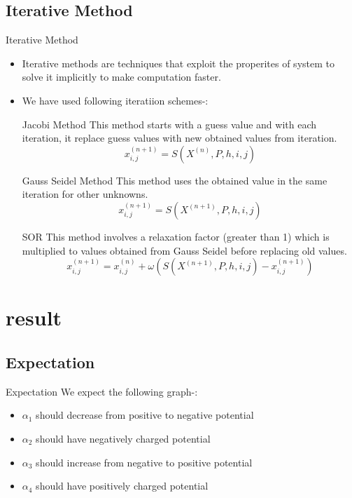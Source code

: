 \documentclass[8pt]{beamer}
\begin{document}
		\subsection{Iterative Method }
		\begin{frame}{Iterative Method}
			\begin{itemize}
				\item Iterative methods are techniques that exploit the properites of system to solve it implicitly to make computation faster.
				\item We have used following iteratiion schemes-:\\
			
					 \begin{block}{Jacobi Method}
						This method starts with a guess value and with each iteration, it replace guess values with new obtained values from iteration.$$ x^{(n+1)}_{i,j} = S(X^{(n)},P,h,i,j) $$
						\end{block}
					 \begin{block}{Gauss Seidel Method}
						This method uses the obtained value in the same iteration for other unknowns.$$x^{(n+1)}_{i,j} = S(X^{(n+1)},P,h,i,j)$$
						\end{block}
					
					\begin{block}{SOR}
							This method involves a relaxation factor (greater than 1) which is multiplied to values obtained from Gauss Seidel before replacing old values.$$x^{(n+1)}_{i,j} = x^{(n)}_{i,j}+ \omega(S(X^{(n+1)},P,h,i,j)- x^{(n+1)}_{i,j})$$
							
						\end{block}
				
					
					\end{itemize}
				\end{frame}
			\section{result}
				\subsection{Expectation}
				\begin{frame}{Expectation}
					We expect the following graph-:\\
					\begin{itemize}
						\item $ \alpha_1 $ should decrease from positive to negative potential
						\item $ \alpha_2 $ should have negatively charged potential
						\item $ \alpha_3 $ should increase from negative to positive potential
						\item $ \alpha_4 $ should have positively charged  potential
					\end{itemize}
					
				\end{frame}
\end{document}
